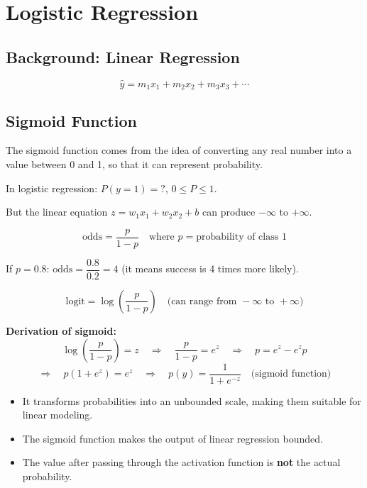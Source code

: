 \documentclass[12pt,a4paper]{article}
\begin{document}
\section{Logistic Regression}

\subsection{Background: Linear Regression}

\[
\hat{y} = m_1 x_1 + m_2 x_2 + m_3 x_3 + \cdots
\]

\subsection{Sigmoid Function}

The sigmoid function comes from the idea of converting any real number into a value between 0 and 1, so that it can represent probability.

In logistic regression: $P(y=1) = ?$, $0 \leq P \leq 1$.

But the linear equation $z = w_1 x_1 + w_2 x_2 + b$ can produce $-\infty$ to $+\infty$.

\[
\text{odds} = \frac{p}{1-p} \quad \text{where } p = \text{probability of class 1}
\]

If $p = 0.8$: $\text{odds} = \dfrac{0.8}{0.2} = 4$ (it means success is 4 times more likely).

\[
\text{logit} = \log\!\left(\frac{p}{1-p}\right) \quad \text{(can range from } -\infty \text{ to } +\infty\text{)}
\]

\textbf{Derivation of sigmoid:}
\[
\log\!\left(\frac{p}{1-p}\right) = z \quad \Rightarrow \quad \frac{p}{1-p} = e^z \quad \Rightarrow \quad p = e^z - e^z p
\]
\[
\Rightarrow\quad p(1 + e^z) = e^z \quad \Rightarrow \quad
\boxed{p(y) = \frac{1}{1+e^{-z}}} \quad \text{(sigmoid function)}
\]

\begin{itemize}
  \item It transforms probabilities into an unbounded scale, making them suitable for linear modeling.
  \item The sigmoid function makes the output of linear regression bounded.
  \item The value after passing through the activation function is \textbf{not} the actual probability.
\end{itemize}
\end{document}
